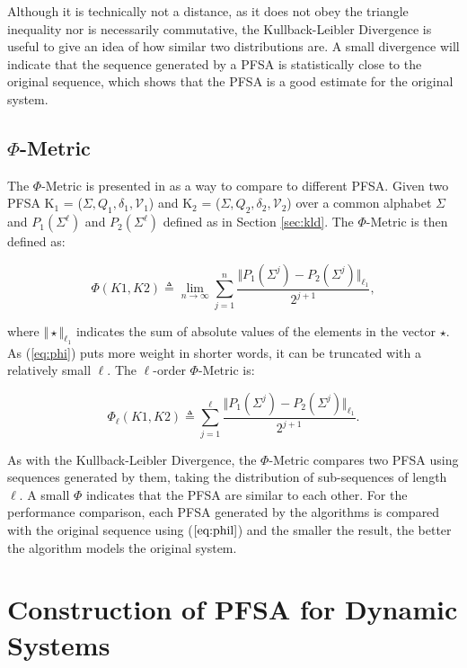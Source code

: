 {Although it is technically not a distance, as it does not obey the triangle inequality nor is necessarily commutative, the Kullback-Leibler Divergence is useful to give an idea of how similar two distributions are. A small divergence will indicate that the sequence generated by a PFSA is statistically close to the original sequence, which shows that the PFSA is a good estimate for the original system.

\subsection{$\Phi$-Metric}

The $\Phi$-Metric is presented in \citep{asok.14} as a way to compare to different PFSA. Given two PFSA K$_1$ = ($\Sigma, Q_1, \delta_1, \mathcal{V}_1$) and K$_2$ = ($\Sigma, Q_2, \delta_2, \mathcal{V}_2$) over a common alphabet $\Sigma$ and  $P_1(\Sigma^{\ell})$ and $P_2(\Sigma^{\ell})$  defined as in Section \ref{sec:kld}. The $\Phi$-Metric is then defined as:

\begin{equation}
\Phi(K1, K2) \triangleq \lim_{n\rightarrow\infty} \sum_{j = 1}^n \frac{\Vert P_1(\Sigma^j)-P_2(\Sigma^j)\Vert_{\ell_1}}{2^{j + 1}},\label{eq:phi}
\end{equation}

\noindent where $\Vert\star\Vert_{\ell_1}$ indicates the sum of absolute values of the elements in the vector $\star$. As (\ref{eq:phi}) puts more weight in shorter words, it can be truncated with a relatively small $\ell$. The $\ell$-order $\Phi$-Metric is:

\begin{equation}
\Phi_{\ell}(K1, K2) \triangleq \sum_{j = 1}^{\ell} \frac{\Vert P_1(\Sigma^j)-P_2(\Sigma^j)\Vert_{\ell_1}}{2^{j + 1}}.\label{eq:phil}
\end{equation}

As with the Kullback-Leibler Divergence, the $\Phi$-Metric compares two PFSA using sequences generated by them, taking the distribution of sub-sequences of length $\ell$. A small $\Phi$ indicates that the PFSA are similar to each other. For the performance comparison, each PFSA generated by the algorithms is compared with the original sequence using ($\ref{eq:phil}$) and the smaller the result, the better the algorithm models the original system.

\section{Construction of PFSA for Dynamic Systems}\label{sec:testcases}

}
